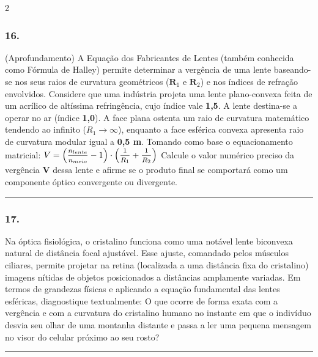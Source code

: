 \documentclass[twoside, 10pt, a4paper]{article}
\newlength{\espacoPreQuestao}\setlength{\espacoPreQuestao}{0.1cm}
\newlength{\espacoQuestao}\setlength{\espacoQuestao}{0.2cm}
\begin{document}
\begin{multicols*}{2}
\subsubsection*{16.} (Aprofundamento) A Equação dos Fabricantes de Lentes (também conhecida como Fórmula de Halley) permite determinar a vergência de uma lente baseando-se nos seus raios de curvatura geométricos ($ \textbf{R}_1 $ e $ \textbf{R}_2 $) e nos índices de refração envolvidos. Considere que uma indústria projeta uma lente plano-convexa feita de um acrílico de altíssima refringência, cujo índice vale \textbf{1,5}. A lente destina-se a operar no ar (índice \textbf{1,0}). A face plana ostenta um raio de curvatura matemático tendendo ao infinito ($ R_1 \rightarrow \infty $), enquanto a face esférica convexa apresenta raio de curvatura modular igual a \textbf{0,5 m}.
Tomando como base o equacionamento matricial:
$ V = \left( \mfrac{n_{lente}}{n_{meio}} - 1 \right) \cdot \left( \mfrac{1}{R_1} + \mfrac{1}{R_2} \right) $
Calcule o valor numérico preciso da vergência \textbf{V} dessa lente e afirme se o produto final se comportará como um componente óptico convergente ou divergente.
\par\vspace{\espacoQuestao}

\noindent\textcolor{CorLinha}{\rule{\linewidth}{0.5pt}} 
\par\vspace{\espacoPreQuestao}
\subsubsection*{17.} Na óptica fisiológica, o cristalino funciona como uma notável lente biconvexa natural de distância focal ajustável. Esse ajuste, comandado pelos músculos ciliares, permite projetar na retina (localizada a uma distância fixa do cristalino) imagens nítidas de objetos posicionados a distâncias amplamente variadas. 
Em termos de grandezas físicas e aplicando a equação fundamental das lentes esféricas, diagnostique textualmente: O que ocorre de forma exata com a vergência e com a curvatura do cristalino humano no instante em que o indivíduo desvia seu olhar de uma montanha distante e passa a ler uma pequena mensagem no visor do celular próximo ao seu rosto?
\par\vspace{\espacoQuestao}

\noindent\textcolor{CorLinha}{\rule{\linewidth}{0.5pt}} 
\par\vspace{\espacoPreQuestao}

\end{multicols*}
\end{document}
